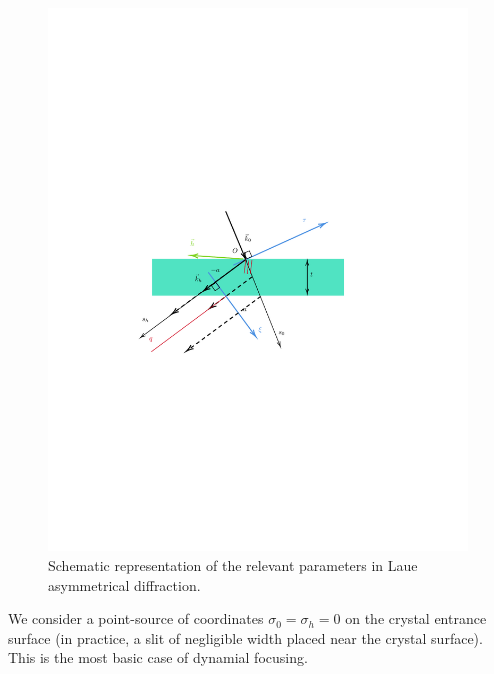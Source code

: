 \documentclass[preprint]{iucr}              %
\begin{document}
\begin{figure}
\label{fig:laue}
\caption{Schematic representation of the relevant parameters in Laue asymmetrical diffraction.
}
\includegraphics[width=0.99\textwidth,trim=3cm 10cm 5cm 10cm,clip=true]{fig3.pdf}
\end{figure}


We consider a point-source of coordinates $\sigma_0=\sigma_h=0$ on the crystal entrance surface (in practice, a slit of negligible width placed near the crystal surface). This is the most basic case of dynamial focusing. 
\end{document}
